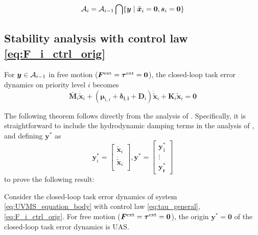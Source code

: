 \documentclass[../main.tex]{subfiles}
\begin{document}
\begin{equation}\label{eq:set_Ai}
    \mathcal{A}_i = \mathcal{A}_{i-1} \bigcap \{\space \bm{y} \mid \tilde{\bm{x}}_i = \bm{0}, \bm{s}_i = \bm{0} \}
\end{equation}

\subsection{Stability analysis with control law \eqref{eq:F_i_ctrl_orig}}
For $\bm{y} \in {\cal{A}}_{i-1}$ in free motion ($\bm{F}^{\rm ext}=\bm{\tau}^{\rm ext} = \bm{0}$), the closed-loop task error dynamics on priority level $i$ becomes
\begin{equation}
    \label{eq:closed_loop_task_orig_free}
    \bar{\bm{M}}_i \ddot{\tilde{\bm{x}}}_i
    + (\bm{\mu}_{i,i} + \bm{\delta_{i,i}}+ \bm{D}_i)\dot{\tilde{\bm{x}}}_i
    + \bm{K}_i \tilde{\bm{x}}_i
    = \bm{0}
\end{equation}

The following theorem follows directly from the analysis of \cite{dietrich2020}. Specifically, it is straightforward to include the hydrodynamic damping terms in the analysis of \cite{dietrich2020}, and defining $\bm{y}^*$ as
\begin{equation}
    \label{eq:y_x_dot}
    \bm{y}^*_i = \begin{bmatrix}
         \tilde{\bm{x}}_i \\
         \dot{\tilde{\bm{x}}}_i \\
     \end{bmatrix},
     \bm{y}^* = \begin{bmatrix}
         \bm{y}_1^* \\
         \vdots \\
         \bm{y_r^*}
     \end{bmatrix}
 \end{equation}
to prove the following result:

\begin{theorem}
    \label{thm:stability_original}
    Consider the closed-loop task error dynamics of system \eqref{eq:UVMS_equation_body} with control law \eqref{eq:tau_general}, \eqref{eq:F_i_ctrl_orig}. For free motion ($\bm{F}^{\rm ext}=\bm{\tau}^{\rm ext} = \bm{0}$), the origin $\bm{y}^* = \bm{0}$ of the closed-loop task error dynamics is UAS.
\end{theorem}
\end{document}
